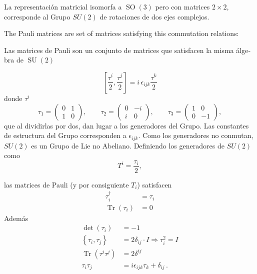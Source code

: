 La representación matricial isomorfa a $\operatorname{SO}(3)$ pero con matrices $2\times2$, corresponde al Grupo $SU(2)$ de rotaciones de dos ejes complejos.
\begin{english}
  The Pauli matrices are set of matrices satisfying this commutation relations:
\end{english}
\begin{spanish}
Las matrices de Pauli son un conjunto de matrices que satisfacen la misma álgebra de $\operatorname{SU}(2)$
\end{spanish}
\begin{frame}
\begin{equation}
  \label{eq:paulialg}
  \left[\frac{\tau^i}{2},\frac{\tau^j}{2} \right]=i\,\epsilon_{ijk}\frac{\tau^k}{2}
\end{equation}
donde $\tau^i$ 
\begin{equation}
  \label{eq:paulimatr}
  \tau_1=
  \begin{pmatrix}
    0&1\\
    1&0
  \end{pmatrix}, \qquad
 \tau_2=
  \begin{pmatrix}
    0&-i\\
    i&0
  \end{pmatrix},\qquad 
 \tau_3=
  \begin{pmatrix}
    1&0\\
    0&-1
  \end{pmatrix},
 \end{equation}
que al dividirlas por dos, dan lugar a los generadores del Grupo. Las constantes de estructura del Grupo corresponden a $\epsilon_{ijk}$. Como los generadores no conmutan, $SU(2)$ es un Grupo de Lie no Abeliano. Definiendo los generadores de $SU(2)$ como
\begin{equation}
  T^i=\frac{\tau_i}{2},
\end{equation}
\end{frame}
las matrices de Pauli (y por consiguiente $T_i$) satisfacen 
\begin{align}
  \tau_i^\dagger&=\tau_i\nonumber\\
  \operatorname{Tr}  \left(
    \tau_i
  \right)&=0
\end{align}
Además
\begin{align}
  \label{eq:64qftw}
  \det
  \left(
    \tau_i
  \right)&=-1\nonumber\\
  \left\{ 
    \tau_i,\tau_j
  \right\}&=2\delta_{ij}\cdot I\Rightarrow\tau_i^2=I\nonumber \\
\operatorname{Tr} \left(\tau^i\tau^j\right)&=2\delta^{ij}\nonumber\\
\tau_i\tau_j&=i\epsilon_{ijk}\tau_k+\delta_{ij}\,.
\end{align}

